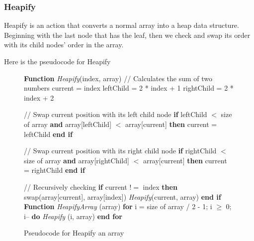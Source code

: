 \documentclass{assignment}
\begin{document}
\newpage
\subsubsection{Heapify}
Heapify is an action that converts a normal array into a heap data structure. Beginning with the last node that has the leaf, then we check and swap its order with its child nodes’ order in the array.

Here is the pseudocode for Heapify 

\begin{figure}[htbp]
    \centering
    \begin{mdframed}
      \begin{algorithmic}
    \STATE \textbf{Function} \textit{Heapify}(index, array)
	\STATE \hspace*{0.5cm} // Calculates the sum of two numbers 
	\STATE \hspace*{0.5cm} current = index
	\STATE \hspace*{0.5cm} leftChild = 2 * index + 1
	\STATE \hspace*{0.5cm} rightChild = 2 * index + 2
		
	\STATE \hspace*{0.5cm} // Swap current position with its left child node
	\STATE \hspace*{0.5cm} \textbf{if} leftChild $<$ size of array \textbf{and} array[leftChild] $<$ array[current] \textbf{then}
		\STATE \hspace*{1cm} current = leftChild
	\STATE \hspace*{0.5cm} \textbf{end if}
	
	\STATE \hspace*{0.5cm} // Swap current position with its right child node
	\STATE \hspace*{0.5cm} \textbf{if} rightChild $<$ size of array \textbf{and} array[rightChild] $<$ array[current] \textbf{then}
		\STATE \hspace*{1cm} current = rightChild
	\STATE \hspace*{0.5cm} \textbf{end if}
	
	\STATE \hspace*{0.5cm} // Recursively checking
	\STATE \hspace*{0.5cm} \textbf{if} current $!=$ index \textbf{then}
		\STATE \hspace*{1cm} swap(array[current], array[index])
		\STATE \hspace*{1cm} \textit{Heapify}(current, array)
	\STATE \hspace*{0.5cm} \textbf{end if}
	\STATE
\STATE \textbf{Function} \textit{HeapifyArray} (array)
	\STATE \hspace*{0.5cm} \textbf{for} i = size of array / 2 - 1; i $\geq$ 0; i-- \textbf{do}
		\STATE \hspace*{1cm} \textit{Heapify} (i, array)
	\STATE \hspace*{0.5cm} \textbf{end for}
\end{algorithmic}
    \end{mdframed}
    \caption{Pseudocode for Heapify an array}
    \label{fig:fig18}
 \end{figure}
 
\end{document}
